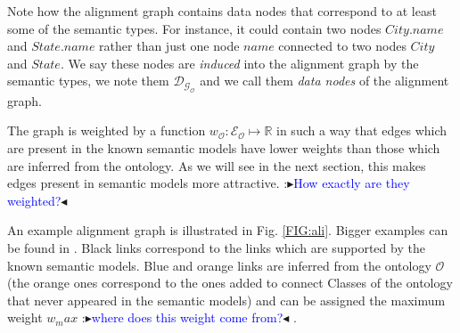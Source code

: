 \documentclass[letterpaper]{article} %
\newcommand{\authornote}[3]{
  {\fbox{\sc 
  #1}:$\blacktriangleright$\textcolor{#2}{\small{#3}}$\blacktriangleleft$}%
}
\newcommand{\ddg}[1]{\authornote{DDG}{blue}{#1}}
\begin{document}
Note how the alignment graph contains data nodes that correspond to at least 
some of the semantic types. 
For instance, it could contain two nodes $City.name$ and $State.name$ rather than just one node $name$ connected to two 
nodes $City$ and $State$. We say these nodes are \emph{induced} into the 
alignment graph by the semantic types, we note them $\mathcal{D_{G_O}}$ and we 
call them \emph{data nodes} of the alignment graph.

The graph is weighted by a function $w_\mathcal{O} : \mathcal{E_O} \mapsto 
\mathbb{R}$ in 
such a way that edges which are present in
the known semantic models have lower weights than those 
which are inferred from the ontology.
As we will see in the next section, this makes edges present in semantic models more attractive. \ddg{How exactly are 
they weighted?}

An example alignment graph is illustrated in Fig. \ref{FIG:ali}. 
Bigger examples can be found in \cite{Taheriyan2013}. 
Black links correspond to the links which are supported by the known semantic models. 
Blue and orange links are inferred from the ontology $\mathcal{O}$ (the orange ones correspond to the ones added to connect Classes of the ontology that never appeared in the semantic models) and can be assigned the 
maximum weight $w_max$ \ddg{where does this weight come from?} .
\end{document}
